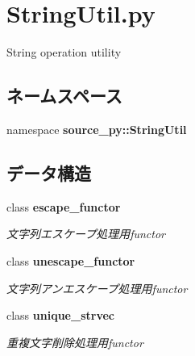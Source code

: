 \section{StringUtil.py}
\label{_string_util_8py}
String operation utility 

\subsection*{ネームスペース}
\begin{CompactItemize}
\item 
namespace \textbf{source\_\-py::StringUtil}
\end{CompactItemize}
\subsection*{データ構造}
\begin{CompactItemize}
\item 
class {\bf escape\_\-functor}
\begin{CompactList}\small\item\em 文字列エスケープ処理用functor \item\end{CompactList}\item 
class {\bf unescape\_\-functor}
\begin{CompactList}\small\item\em 文字列アンエスケープ処理用functor \item\end{CompactList}\item 
class {\bf unique\_\-strvec}
\begin{CompactList}\small\item\em 重複文字削除処理用functor \item\end{CompactList}\end{CompactItemize}
